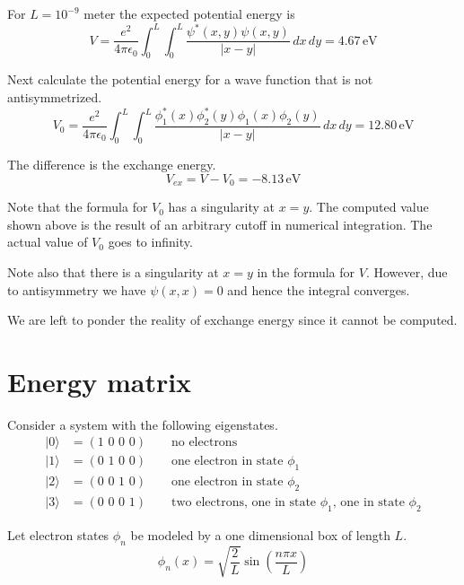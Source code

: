 \documentclass[12pt]{article}
\begin{document}
\noindent
For $L=10^{-9}$ meter the expected potential energy is
\begin{equation*}
V=\frac{e^2}{4\pi\epsilon_0}\int_0^L\int_0^L\frac{\psi^*(x,y)\psi(x,y)}{|x-y|}\,dx\,dy
=4.67\,\text{eV}
\end{equation*}

\noindent
Next calculate the potential energy for a wave function that is not antisymmetrized.
\begin{equation*}
V_0=\frac{e^2}{4\pi\epsilon_0}
\int_0^L\int_0^L\frac{\phi_1^*(x)\phi_2^*(y)\phi_1(x)\phi_2(y)}{|x-y|}\,dx\,dy
=12.80\,\text{eV}
\end{equation*}

\noindent
The difference is the exchange energy.
\begin{equation*}
V_{ex}=V-V_0=-8.13\,\text{eV}
\end{equation*}

\noindent
Note that the formula for $V_0$ has a singularity at $x=y$.
The computed value shown above is the result of an arbitrary cutoff in numerical integration.
The actual value of $V_0$ goes to infinity.

\bigskip
\noindent
Note also that there is a singularity at $x=y$ in the formula for $V$.
However, due to antisymmetry we have $\psi(x,x)=0$ and hence the integral converges.

\bigskip
\noindent
We are left to ponder the reality of exchange energy since it cannot be computed.

\newpage

\section{Energy matrix}
Consider a system with the following eigenstates.
\begin{align*}
|0\rangle&=(\text{1 0 0 0})\qquad\text{no electrons}\\
|1\rangle&=(\text{0 1 0 0})\qquad\text{one electron in state $\phi_1$}\\
|2\rangle&=(\text{0 0 1 0})\qquad\text{one electron in state $\phi_2$}\\
|3\rangle&=(\text{0 0 0 1})\qquad\text{two electrons, one in state $\phi_1$, one in state $\phi_2$}
\end{align*}

\noindent
Let electron states $\phi_n$ be modeled by a one dimensional box of length $L$.
\begin{equation*}
\phi_n(x)=\sqrt{\frac{2}{L}}\sin\left(\frac{n\pi x}{L}\right)
\end{equation*}
\end{document}
